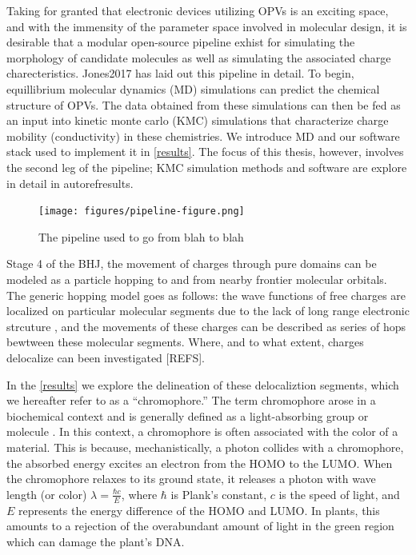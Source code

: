Taking for granted that electronic devices utilizing OPVs is an exciting
space, and with the immensity of the parameter space involved in molecular design, it is desirable that a modular
open-source pipeline exhist for simulating the morphology of candidate molecules as well as simulating the 
associated charge charecteristics. Jones2017 has laid out this
pipeline in detail. To begin, equillibrium molecular dynamics (MD) simulations can predict the chemical
structure of OPVs. The data obtained from these simulations can then be fed as an input into kinetic monte
carlo (KMC) simulations that characterize charge mobility (conductivity) in these chemistries. We introduce MD
and our software stack used to implement it in \autoref{results}. The focus of this thesis, however, involves
the second leg of the pipeline; KMC simulation methods and software are explore in detail in autoref{results}.
\begin{figure}
  \center
  \texttt{[image: figures/pipeline-figure.png]} 
    \caption{The pipeline used to go from blah to blah}
  \label{pipeline}
\end{figure}

Stage 4 of the BHJ, the movement of charges through pure domains can be modeled as a particle hopping 
to and from nearby frontier molecular orbitals.
The generic hopping model goes as follows: the wave functions of
free charges are localized on particular molecular segments due to the lack of long range electronic strcuture
, and the movements of these charges can be described as series
of hops bewtween these molecular segments. Where, and to what extent, charges delocalize can been investigated
[REFS]. 

In the \autoref{results} we explore the delineation of these delocaliztion segments, which we hereafter refer to as a
``chromophore.'' 
The term chromophore arose in a biochemical context and is generally defined
as a light-absorbing group or molecule \cite{biochemistry}.
In this context, a chromophore is often associated with the color of a material.
This is because, mechanistically, a photon collides with a chromophore, the absorbed energy
excites an electron from the HOMO to the
LUMO. When the chromophore relaxes to its
ground state, it releases a photon with wave length (or color) $\lambda = \frac{\hbar c}{E}$,
where $\hbar$ is Plank's constant, $c$ is the speed of light, and $E$ represents the
energy difference of the HOMO and LUMO. In plants, this amounts to a rejection of the overabundant amount of
light in the green region which can damage the plant's DNA. 

